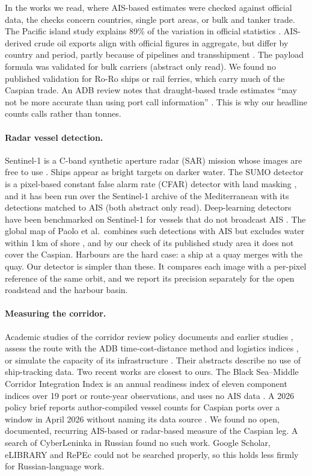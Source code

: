 \documentclass[11pt,a4paper]{article}
\begin{document}
In the works we read, where AIS-based estimates were checked against official data, the checks concern countries, single port areas, or bulk and tanker trade. The Pacific island study explains 89\% of the variation in official statistics \cite{arslanalp2021tracking}. AIS-derived crude oil exports align with official figures in aggregate, but differ by country and period, partly because of pipelines and transshipment \cite{adland2017ais}. The payload formula was validated for bulk carriers \cite{jia2019estimating} (abstract only read). We found no published validation for Ro-Ro ships or rail ferries, which carry much of the Caspian trade. An ADB review notes that draught-based trade estimates ``may not be more accurate than using port call information'' \cite{adb2023ais}. This is why our headline counts calls rather than tonnes.

\paragraph{Radar vessel detection.} Sentinel-1 is a C-band synthetic aperture radar (SAR) mission whose images are free to use \cite{torres2012sentinel}. Ships appear as bright targets on darker water. The SUMO detector is a pixel-based constant false alarm rate (CFAR) detector with land masking \cite{greidanus2017sumo}, and it has been run over the Sentinel-1 archive of the Mediterranean with its detections matched to AIS \cite{santamaria2017mass} (both abstract only read). Deep-learning detectors have been benchmarked on Sentinel-1 for vessels that do not broadcast AIS \cite{paolo2022xview3}. The global map of Paolo et al.\ combines such detections with AIS but excludes water within 1\,km of shore \cite{paolo2024satellite}, and by our check of its published study area it does not cover the Caspian. Harbours are the hard case: a ship at a quay merges with the quay. Our detector is simpler than these. It compares each image with a per-pixel reference of the same orbit, and we report its precision separately for the open roadstead and the harbour basin.

\paragraph{Measuring the corridor.} Academic studies of the corridor review policy documents and earlier studies \cite{palu2023future}, assess the route with the ADB time-cost-distance method and logistics indices \cite{nurseiit2025attractiveness}, or simulate the capacity of its infrastructure \cite{zhumanov2024trans}. Their abstracts describe no use of ship-tracking data. Two recent works are closest to ours. The Black Sea--Middle Corridor Integration Index is an annual readiness index of eleven component indices over 19 port or route-year observations, and uses no AIS data \cite{gondauri2026bsmcii}. A 2026 policy brief reports author-compiled vessel counts for Caspian ports over a window in April 2026 without naming its data source \cite{wu2026caspianshock}. We found no open, documented, recurring AIS-based or radar-based measure of the Caspian leg. A search of CyberLeninka in Russian found no such work. Google Scholar, eLIBRARY and RePEc could not be searched properly, so this holds less firmly for Russian-language work.
\end{document}
